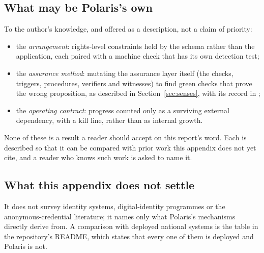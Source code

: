 \subsection{What may be Polaris's own}

To the author's knowledge, and offered as a description, not a claim of priority:
\begin{itemize}
  \item the \emph{arrangement}: rights-level constraints held by the schema rather than the
    application, each paired with a machine check that has its own detection test;
  \item the \emph{assurance method}: mutating the assurance layer itself (the checks, triggers,
    procedures, verifiers and witnesses) to find green checks that prove the wrong proposition, as
    described in Section~\ref{sec:senses}, with its record in \evidencerecord;
  \item the \emph{operating contract}: progress counted only as a surviving external dependency,
    with a kill line, rather than as internal growth.
\end{itemize}
None of these is a result a reader should accept on this report's word. Each is described so that it
can be compared with prior work this appendix does not yet cite, and a reader who knows such work is
asked to name it.

\subsection{What this appendix does not settle}

It does not survey identity systems, digital-identity programmes or the anonymous-credential
literature; it names only what Polaris's mechanisms directly derive from. A comparison with deployed
national systems is the table in the repository's README, which states that every one of them is
deployed and Polaris is not.

